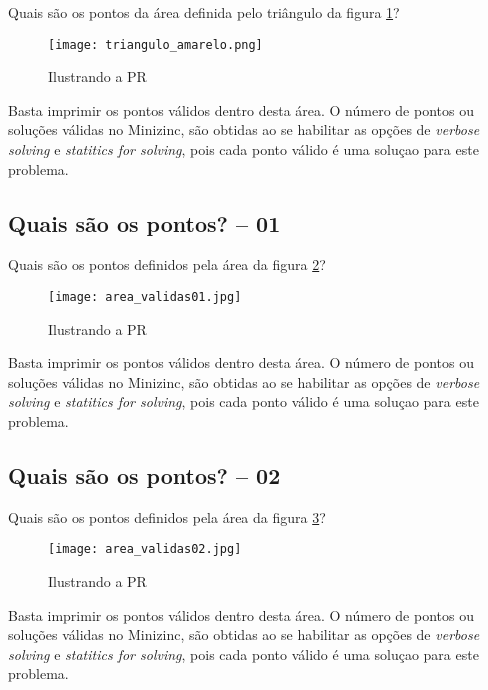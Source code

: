Quais são os pontos da área definida pelo triângulo da figura \ref{fig_triangulo}?

 \begin{figure}[!ht]
  \centering
      \texttt{[image: triangulo\_amarelo.png]}
      \caption{Ilustrando a PR}
\label{fig_triangulo}
\end{figure}
Basta imprimir os pontos válidos dentro desta área. O número de pontos ou soluções válidas
no Minizinc, são obtidas ao se habilitar as opções de \textit{verbose solving} e \textit{statitics for solving}, pois cada ponto válido é uma soluçao para este problema.





\subsection{Quais são os pontos? -- 01}
 Quais são os pontos definidos  pela área  da figura \ref{fig_area_validas01}?
 \begin{figure}[!h]
  \centering
      \texttt{[image: area\_validas01.jpg]}
      \caption{Ilustrando a PR}
\label{fig_area_validas01}
\end{figure}

Basta imprimir os pontos válidos dentro desta área. O número de pontos ou soluções válidas
no Minizinc, são obtidas ao se habilitar as opções de \textit{verbose solving} e \textit{statitics for solving}, pois cada ponto válido é uma soluçao para este problema.



\subsection{Quais são os pontos? -- 02}

 Quais são os pontos definidos  pela área da figura \ref{fig_area_validas02}?
 \begin{figure}[!ht]
  \centering
      \texttt{[image: area\_validas02.jpg]}
      \caption{Ilustrando a PR}
\label{fig_area_validas02}
\end{figure}

Basta imprimir os pontos válidos dentro desta área. O número de pontos ou soluções válidas
no Minizinc, são obtidas ao se habilitar as opções de \textit{verbose solving} e \textit{statitics for solving}, pois cada ponto válido é uma soluçao para este problema.



